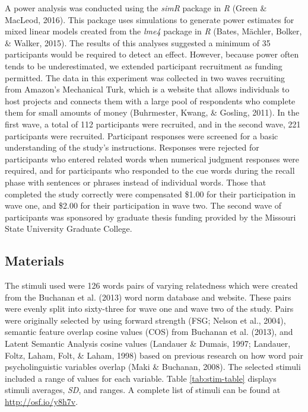 \documentclass[english,,man]{apa6}
\begin{document}
A power analysis was conducted using the \emph{simR} package in \emph{R} (Green \& MacLeod, 2016). This package uses simulations to generate power estimates for mixed linear models created from the \emph{lme4} package in \emph{R} (Bates, Mächler, Bolker, \& Walker, 2015). The results of this analyses suggested a minimum of 35 participants would be required to detect an effect. However, because power often tends to be underestimated, we extended participant recruitment as funding permitted. The data in this experiment was collected in two waves recruiting from Amazon's Mechanical Turk, which is a website that allows individuals to host projects and connects them with a large pool of respondents who complete them for small amounts of money (Buhrmester, Kwang, \& Gosling, 2011). In the first wave, a total of 112 participants were recruited, and in the second wave, 221 participants were recruited. Participant responses were screened for a basic understanding of the study's instructions. Responses were rejected for participants who entered related words when numerical judgment responses were required, and for participants who responded to the cue words during the recall phase with sentences or phrases instead of individual words. Those that completed the study correctly were compensated \$1.00 for their participation in wave one, and \$2.00 for their participation in wave two. The second wave of participants was sponsored by graduate thesis funding provided by the Missouri State University Graduate College.

\hypertarget{materials}{%
\subsection{Materials}\label{materials}}

The stimuli used were 126 words pairs of varying relatedness which were created from the Buchanan et al. (2013) word norm database and website. These pairs were evenly split into sixty-three for wave one and wave two of the study. Pairs were originally selected by using forward strength (FSG; Nelson et al., 2004), semantic feature overlap cosine values (COS) from Buchanan et al. (2013), and Latent Semantic Analysis cosine values (Landauer \& Dumais, 1997; Landauer, Foltz, Laham, Folt, \& Laham, 1998) based on previous research on how word pair psycholinguistic variables overlap (Maki \& Buchanan, 2008). The selected stimuli included a range of values for each variable. Table \ref{tab:stim-table} displays stimuli averages, \emph{SD}, and ranges. A complete list of stimuli can be found at \url{http://osf.io/y8h7v}.
\end{document}
